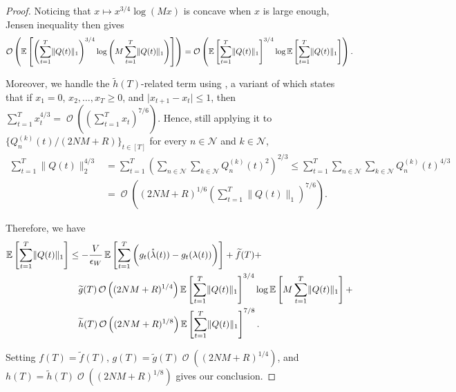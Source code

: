 \documentclass[11pt,fullpage,letterpaper]{article} %
\renewcommand{\bm}[1]{#1}%
\renewcommand{\tilde}{\widetilde}
\renewcommand{\O}{\operatorname{\mathcal O}}
\newcommand{\E}{\operatornamewithlimits{\mathbb{E}}}
\newcommand{\mN}{{\mathcal N}}
\begin{document}
\begin{proof}
Noticing that $x\mapsto x^{3/4} \log (M x)$ is concave when $x$ is large enough, Jensen inequality then gives
\begin{equation*}
\O\left (\E\left [\left (\sum_{t=1}^T \lVert \bm Q(t)\rVert_1\right )^{3/4} \log \left (M \sum_{t=1}^T \lVert \bm Q(t)\rVert_1\right ) \right ]\right )= \O\left (\E\left [\sum_{t=1}^T \lVert \bm Q(t)\rVert_1\right ]^{3/4} \log \E \left [ \sum_{t=1}^T \lVert \bm Q(t)\rVert_1\right ]\right ).
\end{equation*}

Moreover, we handle the $\tilde h(T)$-related term using , a variant of  which states that if $x_1=0$, $x_2,\ldots,x_T \ge 0$, and $\lvert x_{t+1}-x_t\rvert\le 1$, then $\sum_{t=1}^T x_t^{4/3} = \O\left ((\sum_{t=1}^T x_t)^{7/6}\right )$. Hence, still applying it to $\{Q_n^{(k)}(t) / (2NM + R)\}_{t\in [T]}$ for every $n\in \mN$ and $k\in \mN$,
\begin{align*}
\sum_{t=1}^T \lVert \bm Q(t)\rVert_2^{4/3}&=\sum_{t=1}^T \left (\sum_{n\in \mN} \sum_{k\in \mN} Q_n^{(k)}(t)^2\right )^{2/3}\le \sum_{t=1}^T \sum_{n\in \mN} \sum_{k\in \mN} Q_n^{(k)}(t)^{4/3}\\
&=\O\left (\left (2NM+R\right )^{1/6} \left (\sum_{t=1}^T \lVert \bm Q(t)\rVert_1\right )^{7/6}\right ).
\end{align*}

Therefore, we have
\begin{align*}
\E\left [\sum_{t=1}^T \lVert \bm Q(t)\rVert_1\right ]&\le -\frac{V}{\epsilon_W} \E\left [\sum_{t=1}^T \bigg (g_t(\mathring{\bm \lambda}(t)) - g_t(\bm \lambda(t))\bigg )\right ] + \tilde f(T) + \\
&\quad \tilde g(T) \O\left ((2NM+R)^{1/4}\right ) \E\left [\sum_{t=1}^T \lVert \bm Q(t)\rVert_1\right ]^{3/4} \log \E\left [M \sum_{t=1}^T \lVert \bm Q(t)\rVert_1\right ] + \\
&\quad \tilde h(T) \O\left ((2NM+R)^{1/8}\right ) \E\left [\sum_{t=1}^T \lVert \bm Q(t)\rVert_1\right ]^{7/8}.
\end{align*}

Setting $f(T)=\tilde f(T)$, $g(T)=\tilde g(T) \O((2NM+R)^{1/4})$, and $h(T)=\tilde h(T) \O((2NM+R)^{1/8})$ gives our conclusion.
\end{proof}

\end{document}
